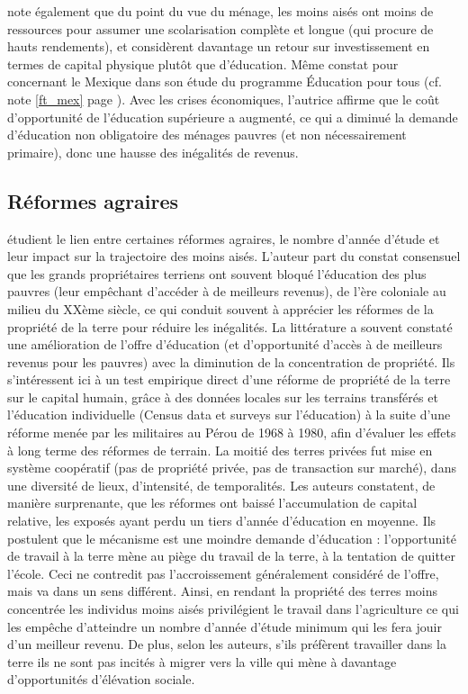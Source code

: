 \documentclass[pagesize, twoside=off, bibliography=totoc, DIV=calc, fontsize=12pt, a4paper, french]{scrartcl}
\begin{document}
 note également que du point du vue du ménage, les moins aisés ont moins de ressources pour assumer une scolarisation complète et longue (qui procure de hauts rendements), et considèrent davantage un retour sur investissement en termes de capital physique plutôt que d’éducation.
Même constat pour \citet{urbina} concernant le Mexique dans son étude du programme \og{}Éducation pour tous\fg{} (cf. note \ref{ft_mex} page \pageref{ft_mex}).
Avec les crises économiques, l’autrice affirme que le coût d’opportunité de l’éducation supérieure a augmenté, ce qui a diminué la demande d’éducation non obligatoire des ménages pauvres (et non nécessairement primaire), donc une hausse des inégalités de revenus.

\subsection{Réformes agraires}

 étudient le lien entre certaines réformes agraires, le nombre d’année d’étude et leur impact sur la trajectoire des moins aisés.
L’auteur part du constat consensuel que les grands propriétaires terriens ont souvent bloqué l’éducation des plus pauvres (leur empêchant d’accéder à de meilleurs revenus), de l’ère coloniale au milieu du XXème siècle, ce qui conduit souvent à apprécier les réformes de la propriété de la terre pour réduire les inégalités.
La littérature a souvent constaté une amélioration de l’offre d’éducation (et d’opportunité d’accès à de meilleurs revenus pour les pauvres) avec la diminution de la concentration de propriété.
Ils s’intéressent ici à un test empirique direct d’une réforme de propriété de la terre sur le capital humain, grâce à des données locales sur les terrains transférés et l’éducation individuelle (Census data et surveys sur l’éducation) à la suite d’une réforme menée par les militaires au Pérou de 1968 à 1980, afin d’évaluer les effets à long terme des réformes de terrain.
La moitié des terres privées fut mise en système coopératif (pas de propriété privée, pas de transaction sur marché), dans une diversité de lieux, d’intensité, de temporalités.
Les auteurs constatent, de manière surprenante, que les réformes ont baissé l’accumulation de capital relative, les exposés ayant perdu un tiers d’année d’éducation en moyenne.
Ils postulent que le mécanisme est une moindre demande d’éducation : l’opportunité de travail à la terre mène au piège du travail de la terre, à la tentation de quitter l’école.
Ceci ne contredit pas l’accroissement généralement considéré de l’offre, mais va dans un sens différent.
Ainsi, en rendant la propriété des terres moins concentrée les individus moins aisés privilégient le travail dans l’agriculture ce qui les empêche d’atteindre un nombre d’année d’étude minimum qui les fera jouir d’un meilleur revenu.
De plus, selon les auteurs, s’ils préfèrent travailler dans la terre ils ne sont pas incités à migrer vers la ville qui mène à davantage d’opportunités d’élévation sociale.
\end{document}

